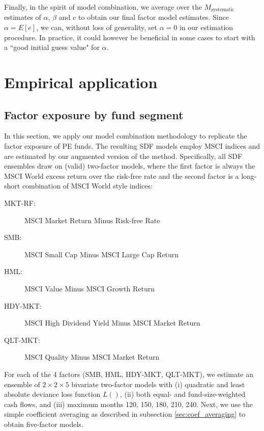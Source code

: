 \documentclass[12pt]{article}
\begin{document}
Finally, in the spirit of model combination, we average over the $M_{\mathrm{systematic}}$ estimates of $\alpha$, $\beta$ and $e$ to obtain our final factor model estimates.
Since $\alpha=E[e]$, we can, without loss of generality, set $\alpha=0$ in our estimation procedure.
In practice, it could however be beneficial in some cases to start with a ``good initial guess value" for $\alpha$.


\section{Empirical application}
\label{sec:applications}

\subsection{Factor exposure by fund segment}
\label{sec:factor_exposure}

In this section, we apply our model combination methodology to replicate the factor exposure of PE funds.
The resulting SDF models employ MSCI indices and are estimated by our augmented version of the \cite{DLP12} method.
Specifically, all SDF ensembles draw on (valid) two-factor models, where the first factor is always the MSCI World excess return over the risk-free rate and the second factor is a long-short combination of MSCI World style indices:
\begin{description}
	\item[MKT-RF:]{MSCI Market Return Minus Risk-free Rate}
	\item[SMB:]{MSCI Small Cap Minus MSCI Large Cap Return}
	\item[HML:]{MSCI Value Minus MSCI Growth Return}
	\item[HDY-MKT:]{MSCI High Dividend Yield Minus MSCI Market Return}
	\item[QLT-MKT:]{MSCI Quality Minus MSCI Market Return}
\end{description}
For each of the 4 factors (SMB, HML, HDY-MKT, QLT-MKT), we estimate an ensemble of $2 \times 2 \times 5$ bivariate two-factor models with (i) quadratic and least absolute deviance loss function $L()$, (ii) both equal- and fund-size-weighted cash flows, and (iii) maximum months 120, 150, 180, 210, 240.
Next, we use the simple coefficient averaging as described in subsection \ref{sec:coef_averaging} to obtain five-factor models.
\end{document}
